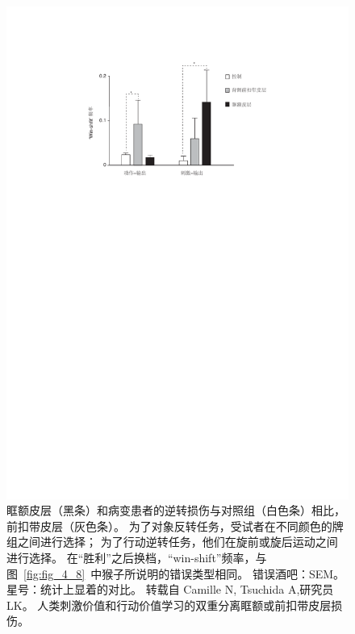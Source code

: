 \begin{figure}[!htb]
	\centering
	\includegraphics{chap4/fig_4_9}
	\caption{眶额皮层（黑条）和病变患者的逆转损伤与对照组（白色条）相比，前扣带皮层（灰色条）。
		为了对象反转任务，受试者在不同颜色的牌组之间进行选择；
		为了行动逆转任务，他们在旋前或旋后运动之间进行选择。
		在“胜利”之后换档，“win-shift”频率，与图~\ref{fig:fig_4_8}~中猴子所说明的错误类型相同。
		错误酒吧：SEM。
		星号：统计上显着的对比。
		转载自 Camille N, Tsuchida A,研究员LK。
		人类刺激价值和行动价值学习的双重分离眶额或前扣带皮层损伤\cite{camille2011double}。}
	\label{fig:fig_4_9}
\end{figure}


